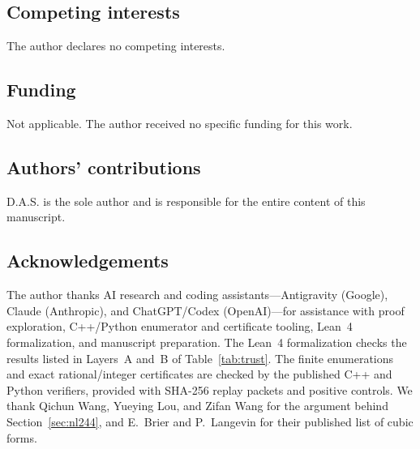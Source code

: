 \documentclass[11pt]{article}
\theoremstyle{definition}
\begin{document}
\subsection*{Competing interests}
The author declares no competing interests.

\subsection*{Funding}
Not applicable. The author received no specific funding for this work.

\subsection*{Authors' contributions}
D.A.S. is the sole author and is responsible for the entire content of this manuscript.

\subsection*{Acknowledgements}
The author thanks AI research and coding assistants---Antigravity (Google), Claude (Anthropic), and ChatGPT/Codex (OpenAI)---for assistance with proof exploration, C++/Python enumerator and certificate tooling, Lean~4 formalization, and manuscript preparation. The Lean~4 formalization checks the results listed in Layers~A and~B of Table~\ref{tab:trust}. The finite enumerations and exact rational/integer certificates are checked by the published C++ and Python verifiers, provided with SHA-256 replay packets and positive controls. We thank Qichun Wang, Yueying Lou, and Zifan Wang for the argument behind Section~\ref{sec:nl244}, and E.~Brier and P.~Langevin for their published list of cubic forms.
\end{document}
